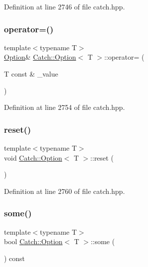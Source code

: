 Definition at line 2746 of file catch.\+hpp.

\hypertarget{class_catch_1_1_option_a2be7e343ab22d6061726d32ab4622653}{}\label{class_catch_1_1_option_a2be7e343ab22d6061726d32ab4622653} 
\subsubsection{\texorpdfstring{operator=()}{operator=()}\hspace{0.1cm}{\footnotesize\ttfamily [2/2]}}
{\footnotesize\ttfamily template$<$typename T$>$ \\
\hyperlink{class_catch_1_1_option}{Option}\& \hyperlink{class_catch_1_1_option}{Catch\+::\+Option}$<$ T $>$\+::operator= (\begin{DoxyParamCaption}\item[{T const \&}]{\+\_\+value }\end{DoxyParamCaption})\hspace{0.3cm}{\ttfamily [inline]}}



Definition at line 2754 of file catch.\+hpp.

\hypertarget{class_catch_1_1_option_a37b4e0e5d4d56296adacd267a616f4e0}{}\label{class_catch_1_1_option_a37b4e0e5d4d56296adacd267a616f4e0} 
\subsubsection{\texorpdfstring{reset()}{reset()}}
{\footnotesize\ttfamily template$<$typename T$>$ \\
void \hyperlink{class_catch_1_1_option}{Catch\+::\+Option}$<$ T $>$\+::reset (\begin{DoxyParamCaption}{ }\end{DoxyParamCaption})\hspace{0.3cm}{\ttfamily [inline]}}



Definition at line 2760 of file catch.\+hpp.

\hypertarget{class_catch_1_1_option_a97c95829afbe92f2bcc5fd75b32c0825}{}\label{class_catch_1_1_option_a97c95829afbe92f2bcc5fd75b32c0825} 
\subsubsection{\texorpdfstring{some()}{some()}}
{\footnotesize\ttfamily template$<$typename T$>$ \\
bool \hyperlink{class_catch_1_1_option}{Catch\+::\+Option}$<$ T $>$\+::some (\begin{DoxyParamCaption}{ }\end{DoxyParamCaption}) const\hspace{0.3cm}{\ttfamily [inline]}}



